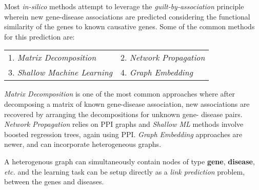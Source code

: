 \begin{sloppypar*}

    Most \textit{in-silico} methods attempt to leverage the \textit{guilt-by-association}
    principle wherein new gene-disease associations are predicted considering the
    functional similarity of the genes to known causative genes. Some of the common
    methods for this prediction are:

    \begin{tabularx}{\textwidth}{XX}
        1. \textit{Matrix Decomposition} & 2. \textit{Network Propagation} \\
        3. \textit{Shallow Machine Learning} & 4. \textit{Graph Embedding} \\
    \end{tabularx} \hfill\break

    \noindent \textit{Matrix Decomposition} is one of the most common approaches
    where after decomposing a matrix of known gene-disease association, new
    associations are recovered by arranging the decompositions for unknown gene-
    disease pairs. \textit{Network Propagation} relies on PPI graphs and
    \textit{Shallow ML} methods involve boosted regression trees, again using PPI.
    \textit{Graph Embedding} approaches are newer, and can incorporate heterogeneous
    graphs. \hfill\break

    \noindent A heterogenous graph can simultaneously contain nodes of type \textbf{gene},
    \textbf{disease}, \textit{etc.} and the learning task can be setup directly
    as a \textit{link prediction} problem, between the genes and diseases.


    
\end{sloppypar*}